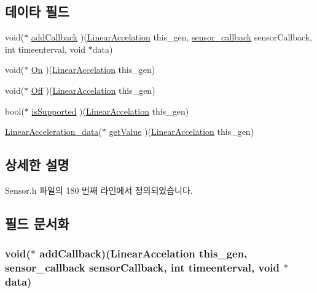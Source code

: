 \subsection*{데이타 필드}
\begin{DoxyCompactItemize}
\item 
void($\ast$ \hyperlink{struct___linear_accelation_a8951a1ec6ac7c7aea7f13701f0179f7e}{add\-Callback} )(\hyperlink{_sensor_8h_ab6e374e44978536ed25c1f68f0cb0268}{Linear\-Accelation} this\-\_\-gen, \hyperlink{_sensor_8h_ad8114207845fc5e0aa30832f0c718cd6}{sensor\-\_\-callback} sensor\-Callback, int timeenterval, void $\ast$data)
\item 
void($\ast$ \hyperlink{struct___linear_accelation_a94a5c6752cd1bf18e8d4f1aff25c88e8}{On} )(\hyperlink{_sensor_8h_ab6e374e44978536ed25c1f68f0cb0268}{Linear\-Accelation} this\-\_\-gen)
\item 
void($\ast$ \hyperlink{struct___linear_accelation_a5ecc7fba6af596a66129373e0157f9a2}{Off} )(\hyperlink{_sensor_8h_ab6e374e44978536ed25c1f68f0cb0268}{Linear\-Accelation} this\-\_\-gen)
\item 
bool($\ast$ \hyperlink{struct___linear_accelation_afc42a6003589d08871b06adfc3f2ee9c}{is\-Supported} )(\hyperlink{_sensor_8h_ab6e374e44978536ed25c1f68f0cb0268}{Linear\-Accelation} this\-\_\-gen)
\item 
\hyperlink{_sensor_8h_ab972181c85e723d7d5b22be3b9519281}{Linear\-Acceleration\-\_\-data}($\ast$ \hyperlink{struct___linear_accelation_aaf02870c60aa510568b3376a4cd4d965}{get\-Value} )(\hyperlink{_sensor_8h_ab6e374e44978536ed25c1f68f0cb0268}{Linear\-Accelation} this\-\_\-gen)
\end{DoxyCompactItemize}


\subsection{상세한 설명}


Sensor.\-h 파일의 180 번째 라인에서 정의되었습니다.



\subsection{필드 문서화}
\hypertarget{struct___linear_accelation_a8951a1ec6ac7c7aea7f13701f0179f7e}{
\subsubsection[{add\-Callback}]{\setlength{\rightskip}{0pt plus 5cm}void($\ast$  add\-Callback)({\bf Linear\-Accelation} this\-\_\-gen, {\bf sensor\-\_\-callback} sensor\-Callback, int timeenterval, void $\ast$data)}}\label{struct___linear_accelation_a8951a1ec6ac7c7aea7f13701f0179f7e}


